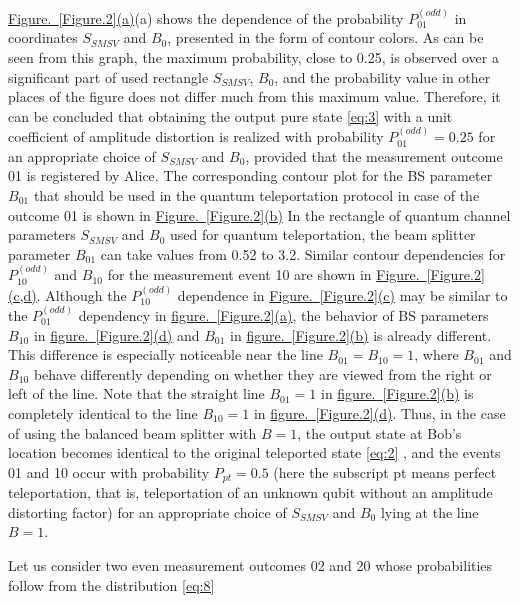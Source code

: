 \documentclass{optica-article}
\begin{document}
\par \hyperref[Figure.2]{Figure.~\ref*{Figure.2}(a)}(a) shows the dependence of the probability $P_{01}^{(odd)}$ in coordinates $S_{SMSV}$ and $B_0$, presented in the form of contour colors. As can be seen from this graph, the maximum probability, close to 0.25, is observed over a significant part of used rectangle $S_{SMSV}$, $B_0$, and the probability value in other places of the figure does not differ much from this maximum value. Therefore, it can be concluded that obtaining the output pure state \eqref{eq:3}  with  a unit coefficient of amplitude distortion is realized with probability $P_{01}^{(odd)}=0.25$ for an appropriate choice of $S_{SMSV}$ and $B_0$, provided that the measurement outcome 01 is registered by Alice. The corresponding contour plot for the BS parameter $B_{01}$ that should be used in the quantum teleportation protocol in case of the outcome 01 is shown in \hyperref[Figure.2]{Figure.~\ref*{Figure.2}(b)} In the rectangle of quantum channel parameters $S_{SMSV}$ and $B_0$ used for quantum teleportation, the beam splitter parameter $B_01$ can take values from 0.52 to 3.2. Similar contour dependencies for $P_{10}^{(odd)}$ and  $B_{10}$ for the measurement event 10 are shown in \hyperref[Figure.2]{Figure.~\ref*{Figure.2}(c,d)}. Although the $P_{10}^{(odd)}$ dependence in \hyperref[Figure.2]{Figure.~\ref*{Figure.2}(c)} may be similar to the $P_{01}^{(odd)}$ dependency in \hyperref[Figure.2]{figure.~\ref*{Figure.2}(a)}, the behavior of BS parameters $B_{10}$ in \hyperref[Figure.2]{figure.~\ref*{Figure.2}(d)} and $B_{01}$ in \hyperref[Figure.2]{figure.~\ref*{Figure.2}(b)} is already different. This difference is especially noticeable near the line $B_{01}=B_{10}=1$, where $B_{01}$ and $B_{10}$ behave differently depending on whether they are viewed from the right or left of the line. Note that the straight line $B_{01}=1$ in \hyperref[Figure.2]{figure.~\ref*{Figure.2}(b)} is completely identical to the line $B_{10}=1$ in \hyperref[Figure.2]{figure.~\ref*{Figure.2}(d)}. Thus, in the case of using the balanced beam splitter with $B=1$, the output state at Bob's location becomes identical to the original teleported state \eqref{eq:2} , and the events 01 and 10 occur with probability $P_{pt}=0.5$ (here the subscript pt means perfect teleportation, that is, teleportation of an unknown qubit without an amplitude distorting factor) for an appropriate choice of $S_{SMSV}$ and $B_0$ lying at the line $B=1$. 
\par Let us consider two even measurement outcomes 02 and 20 whose probabilities follow from the distribution \eqref{eq:8}
\end{document}
